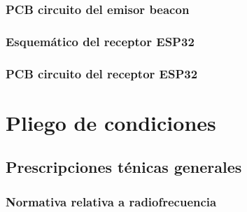 \documentclass[a4paper ,12pt, onecolumn]{article}
\begin{document}
        \subsubsection{PCB circuito del emisor beacon}
        \subsubsection{Esquemático del receptor ESP32}
        \subsubsection{PCB circuito del receptor ESP32}
\section{Pliego de condiciones}
    \subsection{Prescripciones ténicas generales}
    \subsubsection{Normativa relativa a radiofrecuencia}
\end{document}

